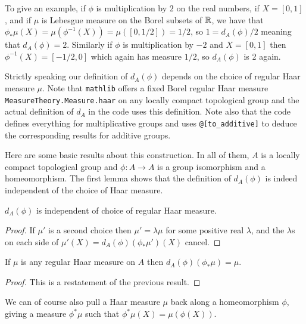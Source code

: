 To give an example, if $\phi$ is multiplication by $2$ on the real numbers,
if $X=[0,1]$, and if $\mu$ is Lebesgue measure on the Borel subsets of $\mathbb{R}$,
we have that $\phi_*\mu(X)=\mu(\phi^{-1}(X))=\mu([0,1/2])=1/2$,
so $1=d_A(\phi)/2$ meaning that $d_A(\phi)=2$. Similarly if $\phi$ is multiplication
by $-2$ and $X=[0,1]$ then $\phi^{-1}(X)=[-1/2,0]$ which again has measure $1/2$,
so $d_A(\phi)$ is 2 again.

Strictly speaking our definition of $d_A(\phi)$ depends on the choice of regular Haar
measure $\mu$. Note that {\tt mathlib} offers a fixed Borel regular Haar measure
{\tt MeasureTheory.Measure.haar} on any locally compact topological group
and the actual definition of $d_A$ in the code uses this definition.
Note also that the code defines everything for multiplicative groups
and uses {\tt @[to\_additive]} to deduce the corresponding results
for additive groups.

Here are some basic results about this construction. In all of them,
$A$ is a locally compact topological group and $\phi:A\to A$ is
a group isomorphism and a homeomorphism. The first lemma shows that
the definition of $d_A(\phi)$ is indeed independent of the choice of Haar measure.

\begin{lemma}
  \label{MeasureTheory.addEquivAddHaarChar_eq}
  \leanok
  $d_A(\phi)$ is independent of choice of regular Haar measure.
\end{lemma}
\begin{proof}
  \leanok
  If $\mu'$ is a second choice then $\mu'=\lambda\mu$ for some
  positive real $\lambda$, and the $\lambda$s on each side of
  $\mu'(X)=d_A(\phi)(\phi_*\mu')(X)$ cancel.
\end{proof}

\begin{lemma}
  \label{MeasureTheory.addEquivAddHaarChar_map}
  \leanok
  If $\mu$ is any regular Haar measure on $A$ then
  $d_A(\phi)(\phi_*\mu) = \mu.$
\end{lemma}
\begin{proof}
  \leanok
  This is a restatement of the previous result.
\end{proof}

We can of course also pull a Haar measure $\mu$ back along a homeomorphism $\phi$,
giving a measure $\phi^*\mu$ such that $\phi^*\mu(X)=\mu(\phi(X))$.

